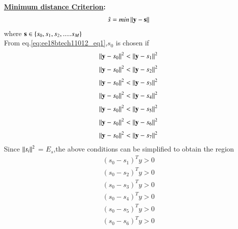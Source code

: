 \begin{enumerate}[label=\thesubsection.\arabic*.,ref=\thesubsection.\theenumi]
\textbf{\underline{Minimum distance Criterion}:}
\begin{align}
    \hat{s} = min \left\lVert\textbf{y} - \textbf{s}\right\rVert
    \label{eq:ee18btech11012_eq1}
\end{align}
where $\textbf{s} \in \left\{s_{0},s_{1},s_{2},.....s_{M}\right\}$\\
From eq.\ref{eq:ee18btech11012_eq1},\textbf{$s_{0}$} is chosen if
\begin{align}
    \left\lVert\textbf{y}-\textbf{$s_{0}$}\right\rVert^2 < \left\lVert\textbf{y}-\textbf{$s_{1}$}\right\rVert^2
\end{align}
\begin{align}
    \left\lVert\textbf{y}-\textbf{$s_{0}$}\right\rVert^2 < \left\lVert\textbf{y}-\textbf{$s_{2}$}\right\rVert^2
\end{align}
\begin{align}
    \left\lVert\textbf{y}-\textbf{$s_{0}$}\right\rVert^2 < \left\lVert\textbf{y}-\textbf{$s_{3}$}\right\rVert^2
\end{align}
\begin{align}
    \left\lVert\textbf{y}-\textbf{$s_{0}$}\right\rVert^2 < \left\lVert\textbf{y}-\textbf{$s_{4}$}\right\rVert^2
\end{align}
\begin{align}
    \left\lVert\textbf{y}-\textbf{$s_{0}$}\right\rVert^2 < \left\lVert\textbf{y}-\textbf{$s_{5}$}\right\rVert^2
\end{align}
\begin{align}
    \left\lVert\textbf{y}-\textbf{$s_{0}$}\right\rVert^2 < \left\lVert\textbf{y}-\textbf{$s_{6}$}\right\rVert^2
\end{align}
\begin{align}
    \left\lVert\textbf{y}-\textbf{$s_{0}$}\right\rVert^2 < \left\lVert\textbf{y}-\textbf{$s_{7}$}\right\rVert^2
\end{align}
Since $\left\lVert s_{i}\right\rVert^2$ = $E_{s}$,the above conditions can be simplified to obtain the region
\begin{align}
    (s_{0}-s_{1})^Ty>0
\end{align}
\begin{align}
    (s_{0}-s_{2})^Ty>0
\end{align}
\begin{align}
    (s_{0}-s_{3})^Ty>0
\end{align}
\begin{align}
    (s_{0}-s_{4})^Ty>0
\end{align}
\begin{align}
    (s_{0}-s_{5})^Ty>0
\end{align}
\begin{align}
    (s_{0}-s_{6})^Ty>0
\end{align}
\begin{align}

\end{align}
\end{enumerate}
